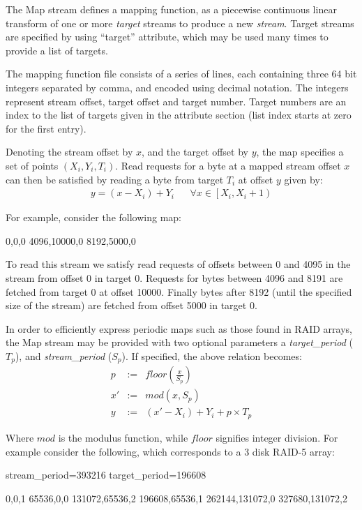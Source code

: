 \documentclass[10pt, conference]{IEEEtran}
\begin{document}
The Map stream defines a mapping function, as a piecewise continuous
linear transform of one or more {\em target} streams to produce a new
{\em stream}. Target streams are specified by using ``target''
attribute, which may be used many times to provide a list of targets.

The mapping function file consists of a series of lines, each
containing three 64 bit integers separated by comma, and encoded using
decimal notation. The integers represent stream offset, target offset
and target number. Target numbers are an index to the list of targets
given in the attribute section (list index starts at zero for the
first entry).

Denoting the stream offset by $x$, and the target offset by $y$, the
map specifies a set of points $(X_i,Y_i,T_i)$. Read requests for a
byte at a mapped stream offset $x$ can then be satisfied by reading a
byte from target $T_i$ at offset $y$ given by:
\begin{eqnarray}
y = (x - X_i) + Y_i & &
\forall x \in \left [X_i, X_i+1 \right )
\end{eqnarray}

For example, consider the following map:
\begin{verbatim*}
0,0,0
4096,10000,0
8192,5000,0
\end{verbatim*}

To read this stream we satisfy read requests of offsets between 0 and
4095 in the stream from offset 0 in target 0. Requests for bytes
between 4096 and 8191 are fetched from target 0 at offset
10000. Finally bytes after 8192 (until the specified size of the
stream) are fetched from offset 5000 in target 0.

In order to efficiently express periodic maps such as those found in
RAID arrays, the Map stream may be provided with two optional
parameters a {\em target\_period} ($T_p$), and {\em stream\_period}
($S_p$). If specified, the above relation becomes:
\begin{eqnarray*}
p &:=& floor\left (\frac{x}{S_p} \right) \\
x' &:=& mod(x ,S_p)  \\   \label{eq:no1}
y &:=& (x'-X_i) + Y_i + p \times T_p
\end{eqnarray*}

Where $mod$ is the modulus function, while $floor$ signifies integer
division. For example consider the following, which corresponds to a 3
disk RAID-5 array:
\begin{verbatim*}
stream_period=393216
target_period=196608

0,0,1
65536,0,0
131072,65536,2
196608,65536,1
262144,131072,0
327680,131072,2
\end{verbatim*}
\end{document}
